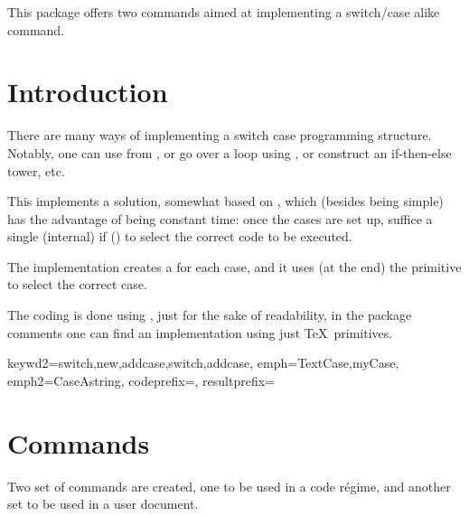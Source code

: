 \documentclass[10pt]{article}
\begin{document}
  

\begin{typesetabstract}
 
This package offers two commands aimed at implementing a switch/case alike command.
\end{typesetabstract}

\tableofcontents

\section{Introduction}
There are many ways of implementing a switch case programming structure. Notably, one can use  from , or go over a loop using \tsobj{\pdfstrcmp}, or construct an if-then-else tower, etc.

This implements a solution, somewhat based on  \cite{stackexchage:switchcase}, which (besides being simple) has the advantage of being constant time: once the cases are set up, suffice a single (internal) if (\tsobj{\ifcsname}) to select the correct code to be executed. 



\begin{tsremark}
  The implementation creates a \tsobj{\csname} for each case, and it uses (at the end) the primitive \tsobj{\ifcsname} to select the correct case.
\end{tsremark}
\begin{tsremark}
  The coding is done using , just for the sake of readability, in the package comments one can find an implementation using just \TeX\  primitives.
\end{tsremark}

  {
    keywd2={switch,new,addcase,switch,addcase},
    emph={TextCase,myCase},
    emph2={CaseAstring},
    codeprefix={},
    resultprefix={}
  }


\section{Commands}
Two set of commands are created, one to be used in a  code régime, and another set to be used in a user document.
\end{document}
